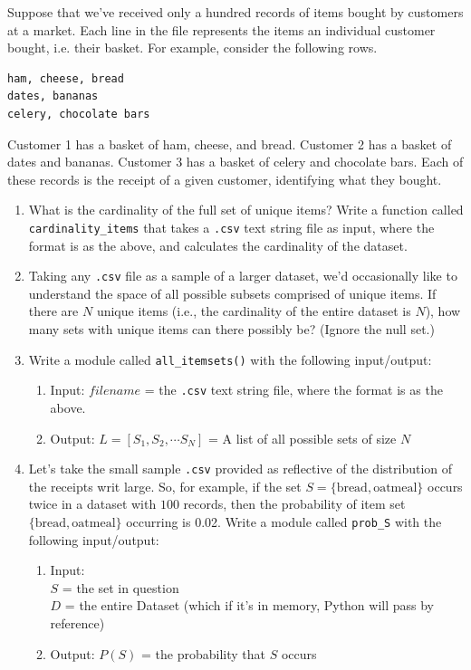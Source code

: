\documentclass[paper=a4, fontsize=11pt]{scrartcl} %
\begin{document}
Suppose that we've received only a hundred records of items bought by customers at a market. Each line in the file represents the items an individual customer bought, i.e. their basket. For example, consider the following rows.

\begin{lstlisting}
ham, cheese, bread
dates, bananas
celery, chocolate bars
\end{lstlisting}

Customer 1 has a basket of ham, cheese, and bread. Customer 2 has a basket of dates and bananas. Customer 3 has a basket of celery and chocolate bars. Each of these records is the receipt of a given customer, identifying what they bought.

\begin{enumerate}
    \item What is the cardinality of the full set of unique items? Write a function called \verb"cardinality_items" that takes a \verb".csv" text string file as input, where the format is as the above, and calculates the cardinality of the dataset.
    \item Taking any \verb".csv" file as a sample of a larger dataset, we'd occasionally like to understand the space of all possible subsets comprised of unique items. If there are $N$ unique items (i.e., the cardinality of the entire dataset is $N$), how many sets with unique items can there possibly be? (Ignore the null set.)
    \item Write a module called \verb"all_itemsets()" with the following input/output:
      \begin{enumerate}
      \item Input: $filename$ = the \verb".csv" text string file, where the format is as the above.
      \item Output: $L = [ S_1, S_2, \cdots S_N ]$ = A list of all possible sets of size $N$
      \end{enumerate}
    \item Let's take the small sample \verb".csv" provided as reflective of the distribution of the receipts writ large. So, for example, if the set $S= \{ \text{bread}, \text{oatmeal}\}$ occurs twice in a dataset with $100$ records, then the probability of item set $\{ \text{bread}, \text{oatmeal} \}$ occurring is 0.02. Write a module called \verb"prob_S" with the following input/output:
      \begin{enumerate}
      \item Input: \\ $S$ = the set in question \\ $D$ = the entire Dataset (which if it's in memory, Python will pass by reference)
      \item Output: $P(S)$ = the probability that $S$ occurs
      \end{enumerate}
\end{enumerate}
\end{document}
